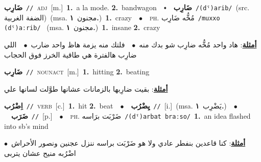 \documentclass[10pt,a4paper,twoside]{article} %
\begin{document}
\begin{multicols}{2}
{{{{{{{{{{{\setlength\topsep{0pt}\textbf{\foreignlanguage{arabic}{ضَارِب}}\ {\color{gray}\texttt{//}\color{black}}\ \textsc{adj}\ [m.]\ \textbf{1.}~a la mode.  \textbf{2.}~bandwagon\ \ $\smblkdiamond$\ \ \setlength\topsep{0pt}\textbf{\foreignlanguage{arabic}{ضَارِب}}\ {\color{gray}\texttt{/(dˤ)arib/}\color{black}}\ (src. \color{gray}\foreignlanguage{arabic}{الضفة الغربية}\color{black})\ \color{gray}(msa. \foreignlanguage{arabic}{مجنون}~\foreignlanguage{arabic}{\textbf{١.}})\color{black}\ \textbf{1.}~crazy\ \ $\bullet$\ \ \textsc{ph.} \color{gray} \foreignlanguage{arabic}{مُخُّه ضَارِب}\color{black}\ {\color{gray}\texttt{/{\sffamily muxxo (dˤ)aːrib}/}\color{black}}\ \color{gray} (msa. \foreignlanguage{arabic}{مجنون}~\foreignlanguage{arabic}{\textbf{١.}})\color{black}\ \textbf{1.}~insane  \textbf{2.}~crazy\  \begin{flushright}\color{gray}\foreignlanguage{arabic}{\textbf{\underline{\foreignlanguage{arabic}{أمثلة}}}: هاد واحد مُخُّه ضارِب شو بدك منه\ $\bullet$\ \  فلتك منه يزمة هاظ واحد ضارب\ $\bullet$\ \  اللي ضارِب هالفترة هي طاقية الخرز فوق الحجاب}\end{flushright}\color{black}} \vspace{2mm}

{\setlength\topsep{0pt}\textbf{\foreignlanguage{arabic}{ضَارِب}}\ {\color{gray}\texttt{//}\color{black}}\ \textsc{noun\textunderscore act}\ [m.]\ \textbf{1.}~hitting  \textbf{2.}~beating\  \begin{flushright}\color{gray}\foreignlanguage{arabic}{\textbf{\underline{\foreignlanguage{arabic}{أمثلة}}}: بقيت ضارِبها بالزمانات عشانها طوَّلت لسانها علي}\end{flushright}\color{black}} \vspace{2mm}

{\setlength\topsep{0pt}\textbf{\foreignlanguage{arabic}{اِضْرُب}}\ {\color{gray}\texttt{//}\color{black}}\ \textsc{verb}\ [c.]\ \textbf{1.}~hit  \textbf{2.}~beat\ \ $\bullet$\ \ \setlength\topsep{0pt}\textbf{\foreignlanguage{arabic}{يِضْرُب}}\ {\color{gray}\texttt{//}\color{black}}\ [i.]\ \color{gray}(msa. \foreignlanguage{arabic}{يَضْرِب}~\foreignlanguage{arabic}{\textbf{١.}})\color{black}\ \ $\bullet$\ \ \setlength\topsep{0pt}\textbf{\foreignlanguage{arabic}{ضَرَب}}\ {\color{gray}\texttt{//}\color{black}}\ [p.]\ \ $\bullet$\ \ \textsc{ph.} \color{gray} \foreignlanguage{arabic}{ضَرْبَت برَاسه}\color{black}\ {\color{gray}\texttt{/{\sffamily (dˤ)arbat braːso}/}\color{black}}\ \textbf{1.}~an idea flashed into sb's mind\  \begin{flushright}\color{gray}\foreignlanguage{arabic}{\textbf{\underline{\foreignlanguage{arabic}{أمثلة}}}: كنا قاعدين بنفطر عادي ولا هو ضَرْبَت براسه ننزل عجنين ونصور الأحراش\ $\bullet$\ \  اضْرُبه منيح عشان يتربى}\end{flushright}\color{black}} \vspace{2mm}

}}}}}}}}}}
\end{multicols}
\end{document}
